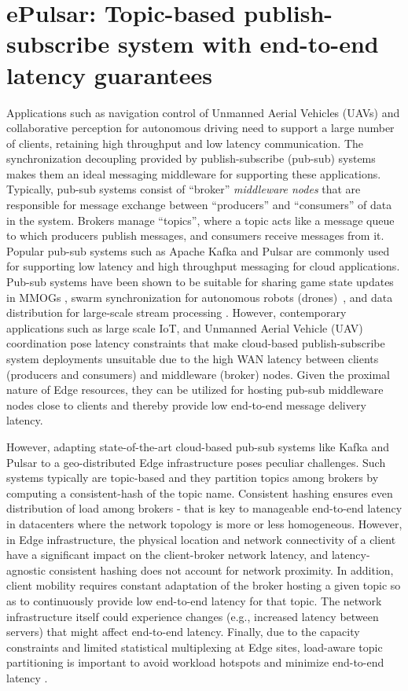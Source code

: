 \chapter{ePulsar: Topic-based publish-subscribe system with end-to-end latency guarantees}
\label{sec:epulsar}

Applications such as navigation control of Unmanned Aerial Vehicles (UAVs) and collaborative perception for autonomous driving need to support a large number of clients, retaining high throughput and low latency communication. The synchronization decoupling provided by publish-subscribe (pub-sub) systems \cite{manyfaces, PubSubForMultiplayerGames} makes them an ideal messaging middleware for supporting these applications. Typically, pub-sub systems consist of ``broker'' \textit{middleware nodes} that are responsible for message exchange  between ``producers'' and ``consumers'' of data in the system. Brokers manage ``topics'', where a topic acts like a message queue to which producers publish messages, and consumers receive messages from it. Popular pub-sub systems such as Apache Kafka and Pulsar are commonly used for supporting low latency and high throughput messaging for cloud applications. %
Pub-sub systems have been shown to be suitable for sharing game state updates in MMOGs  \cite{PubSubForMultiplayerGames}, swarm synchronization for autonomous robots (drones)~\cite{flynetsim}, and data distribution for large-scale stream processing \cite{7164934}. However, contemporary applications such as large scale IoT, and Unmanned Aerial Vehicle (UAV) coordination pose latency constraints that make cloud-based publish-subscribe system deployments unsuitable due to the high WAN latency between clients (producers and consumers) and middleware (broker) nodes. Given the proximal nature of Edge resources, they can be utilized for hosting pub-sub middleware nodes close to clients and thereby provide low end-to-end message delivery latency.
\par However, adapting state-of-the-art cloud-based pub-sub systems like Kafka and Pulsar to a geo-distributed Edge infrastructure poses peculiar challenges. Such systems typically are topic-based and they partition topics among brokers by computing a consistent-hash of the topic name. Consistent hashing ensures even distribution of load among brokers - that is key to manageable end-to-end latency in datacenters where the network topology is more or less homogeneous. However, in Edge infrastructure, the physical location and network connectivity of a client have a significant impact on the client-broker network latency, and latency-agnostic consistent hashing does not account for network proximity. In addition, client mobility requires constant adaptation of the broker hosting a given topic so as to continuously provide low end-to-end latency for that topic. The network infrastructure itself could experience changes (e.g., increased latency between servers) that might affect end-to-end latency. Finally, due to the capacity constraints and limited statistical multiplexing at Edge sites, load-aware topic partitioning is important to avoid workload hotspots and minimize end-to-end latency \cite{khare2018scalable}.

